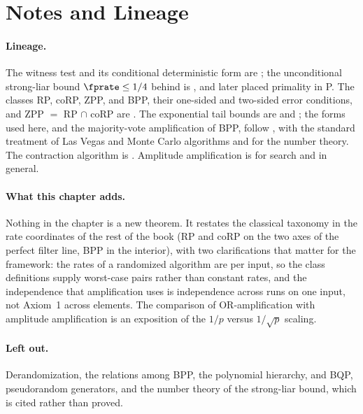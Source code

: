 %

\section{Notes and Lineage}
\label{sec:bib-notes-ch11}

\paragraph{Lineage.}
The witness test and its conditional deterministic form are
\textcite{miller-1976}; the unconditional strong-liar bound $\fprate \le 1/4$
behind  is \textcite{rabin-1980}, and
\textcite{agrawal-kayal-saxena-2004} later placed primality in P. The classes RP,
coRP, ZPP, and BPP, their one-sided and two-sided error conditions, and ZPP $=$
RP $\cap$ coRP are \textcite{gill-1977}. The exponential tail bounds are
\textcite{chernoff-1952} and \textcite{hoeffding-1963}; the forms used here, and
the majority-vote amplification of BPP, follow \textcite[Ch.~4]{mitzenmacher-upfal},
with \textcite{motwani-raghavan} the standard treatment of Las Vegas and Monte
Carlo algorithms and \textcite[Ch.~31]{cormen-clrs} for the number theory. The
contraction algorithm is \textcite{karger-1993}. Amplitude amplification is
\textcite{grover-1996} for search and \textcite{brassard-2002} in general.

\paragraph{What this chapter adds.}
Nothing in the chapter is a new theorem. It restates the classical taxonomy in
the rate coordinates of the rest of the book (RP and coRP on the two axes of the
perfect filter line, BPP in the interior), with two clarifications that matter
for the framework: the rates of a randomized algorithm are per input, so the
class definitions supply worst-case pairs rather than constant rates, and the
independence that amplification uses is independence across runs on one input,
not Axiom~1 across elements. The comparison of OR-amplification with amplitude
amplification is an exposition of the $1/p$ versus $1/\sqrt{p}$ scaling.

\paragraph{Left out.}
Derandomization, the relations among BPP, the polynomial hierarchy, and BQP,
pseudorandom generators, and the number theory of the strong-liar bound, which
is cited rather than proved.

